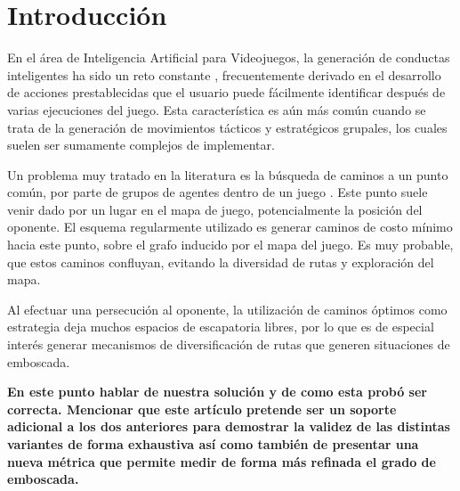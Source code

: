 \section{Introducci\'on}

En el \'area de Inteligencia Artificial para Videojuegos, la generaci\'on
de conductas inteligentes ha sido un reto constante \cite{MF09}, frecuentemente
derivado en el desarrollo de acciones prestablecidas que el usuario puede
f\'acilmente identificar despu\'es de varias ejecuciones del juego.
Esta caracter\'istica es a\'un m\'as com\'un cuando se trata de la generaci\'on
de movimientos t\'acticos y estrat\'egicos grupales, los cuales suelen ser sumamente
complejos de implementar.

Un problema muy tratado en la literatura es la b\'usqueda de caminos
a un punto com\'un, por parte de grupos de agentes dentro de un juego
\cite{MF09}. Este punto suele venir dado por un lugar en el mapa de juego,
potencialmente la posici\'on del oponente. El esquema regularmente utilizado
es generar caminos de costo m\'inimo \cite{HNR72} \cite{RN93}
hacia este punto, sobre el grafo inducido por el mapa del juego. Es
muy probable, que estos caminos confluyan, evitando la diversidad de
rutas y exploraci\'on del mapa.

Al efectuar una persecuci\'on al oponente, la utilizaci\'on de caminos
\'optimos como estrategia deja muchos espacios de escapatoria libres,
por lo que es de especial inter\'es generar mecanismos de diversificaci\'on de
rutas que generen situaciones de emboscada.

\textbf{
En este punto hablar de nuestra soluci\'on y de como esta prob\'o ser
correcta. Mencionar que este art\'iculo pretende ser un soporte adicional
a los dos anteriores para demostrar la validez de las distintas variantes
de forma exhaustiva as\'i como tambi\'en de presentar una nueva m\'etrica
que permite medir de forma m\'as refinada el grado de emboscada.
}

\begin{comment}
La t\'ecnica expuesta pr\'oximamente es adaptable a muchos contextos en
los que, si bien no es necesaria una situaci\'on de emboscada, es
importante generar diversidad de caminos con el fin de no sobresaturar
ciertos sectores del grafo subyacente. Ejemplo de estos son controladores
de tr\'afico, enrutamiento de paquetes f\'isicos o digitales \cite{TMSV03},
rob\'otica, entre otros.
\end{comment}